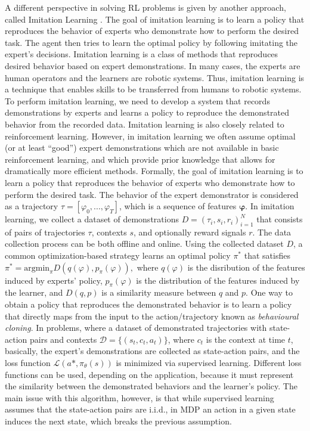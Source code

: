 A different perspective in solving RL problems is given by another approach, called Imitation Learning \cite{il}. The goal of imitation learning is to learn a policy that reproduces the behavior of experts who demonstrate how to perform the desired task. The agent then tries to learn the optimal policy by following imitating the expert’s decisions.
Imitation learning is a class of methods that reproduces desired behavior based on expert demonstrations. In many cases, the experts are human operators and the learners are robotic systems. Thus, imitation learning is a technique that enables skills to be transferred from humans to robotic systems. To perform imitation learning, we need to
develop a system that records demonstrations by experts and learns a policy to reproduce the demonstrated behavior from the recorded data.
Imitation learning is also closely related to reinforcement learning. However, in imitation
learning we often assume optimal (or at least “good”) expert demonstrations which are not available in basic reinforcement learning, and which provide prior knowledge that allows for dramatically more efficient methods.
Formally, the goal of imitation learning is to learn a policy that reproduces the behavior of experts who demonstrate how to perform the desired task. The behavior of the expert demonstrator is considered as a trajectory \(\tau = [\varphi_0, ..., \varphi_T]\), which is a sequence of features $\boldsymbol \varphi.$  In imitation learning, we collect a dataset of demonstrations \(D = {(\tau_i , s_i , r_i)}^N_{i=1}\) that consists of pairs of trajectories $\tau$, contexts $s$, and optionally reward signals $r$. The data collection process can be both offline and online. Using the collected dataset $D$, a common optimization-based strategy learns an optimal policy $\pi^*$ that satisfies \(\pi^*=\text{argmin}_\pi D(q(\varphi),p_\pi(\varphi)),\) where $q(\varphi)$ is the disribution of the features induced by experts' policy, $p_\pi(\varphi)$ is the distribution of the features induced by the learner, and $D(q,p)$ is a similarity measure between $q$ and $p$.
One way to obtain a policy that reproduces the demonstrated behavior is to learn a policy that directly maps from the input to the action/trajectory known as \textit{behavioural cloning}. In problems, where a dataset of demonstrated trajectories with state-action pairs and contexts $\mathcal{D} = \{(s_t , c_t , a_t )\}$, where $c_t$ is the context at time $t$, basically, the expert’s demonstrations are collected as state-action pairs, and the loss function  \(\mathcal{L}(a*,\pi_\theta(s))\) is minimized via supervised learning. 
Different loss functions can be used, depending on the application, because it must represent the similarity between the demonstrated behaviors and the learner’s policy.
The main issue with this algorithm, however, is that while supervised learning assumes that the state-action pairs are i.i.d., in MDP an action in a given state induces the next state, which breaks the previous assumption.

